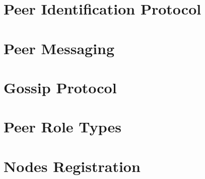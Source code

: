 \documentclass[a4paper, 12pt]{book}
\begin{document}


\section{Peer Identification Protocol}\label{Sec:PIP}



\section{Peer Messaging}



\section{Gossip Protocol}



\section{Peer Role Types}\label{Sec:PRT}

\section{Nodes Registration}\label{Sec:Reg}




%
\end{document}
